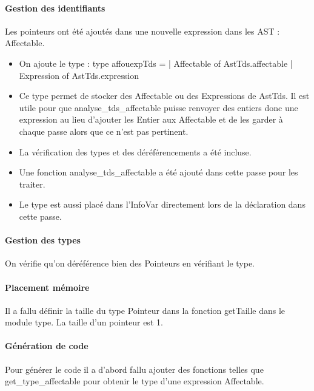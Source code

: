 \documentclass[a4paper,12pt]{article}
\begin{document}
\paragraph{Gestion des identifiants}
Les pointeurs ont été ajoutés dans une nouvelle expression dans les AST : Affectable.

\begin{itemize}

\item 
On ajoute le type :\newline
	type affouexpTds =
	\newline
      | Affectable of AstTds.affectable
  	\newline
      | Expression of AstTds.expression
      
\item Ce type permet de stocker des Affectable ou des Expressions de AstTds. Il est utile pour que analyse\_tds\_affectable puisse renvoyer des entiers donc une expression au lieu d'ajouter les Entier aux Affectable et de les garder à chaque passe alors que ce n'est pas pertinent. 

\item La vérification des types et des déréférencements a été incluse. 

\item Une fonction analyse\_tds\_affectable a été ajouté dans cette passe pour les traiter. 

\item Le type est aussi placé dans l'InfoVar directement lors de la déclaration dans cette passe.
\end{itemize}

\paragraph{Gestion des types}
On vérifie qu'on déréférence bien des Pointeurs en vérifiant le type.
\paragraph{Placement mémoire}
Il a fallu définir la taille du type Pointeur dans la fonction getTaille dans le module type. La taille d'un pointeur est 1.

\paragraph{Génération de code}
Pour générer le code il a d'abord fallu ajouter des fonctions telles que get\_type\_affectable pour obtenir le type d'une expression Affectable.
\end{document}
